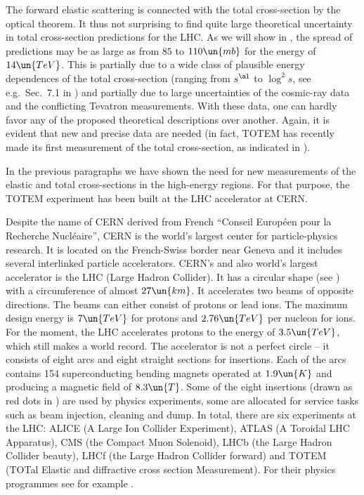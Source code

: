 The forward elastic scattering is connected with the total cross-section by the optical theorem. It thus not surprising to find quite large theoretical uncertainty in total cross-section predictions for the LHC. As we will show in , the spread of predictions may be as large as from $85$ to $110\un{mb}$ for the energy of $14\un{TeV}$. This is partially due to a wide class of plausible energy dependences of the total cross-section (ranging from $s^{\al}$ to $\log^2 s$, see e.g.~Sec.~7.1 in ) and partially due to large uncertainties of the cosmic-ray data and the conflicting Tevatron measurements. With these data, one can hardly favor any of the proposed theoretical descriptions over another. Again, it is evident that new and precise data are needed (in fact, TOTEM has recently made its first measurement of the total cross-section, as indicated in ).

In the previous paragraphs we have shown the need for new measurements of the elastic and total cross-sections in the high-energy regions. For that purpose, the TOTEM experiment has been built at the LHC accelerator at CERN.

Despite the name of CERN derived from French ``Conseil Europ\' een pour la Recherche Nucl\' eaire'', CERN  is the world's largest center for particle-physics research. It is located on the French-Swiss border near Geneva and it includes several interlinked particle accelerators. CERN's and also world's largest accelerator is the LHC  (Large Hadron Collider). It has a circular shape (see ) with a circumference of almost $27\un{km}$. It accelerates two beams of opposite directions. The beams can either consist of protons or lead ions. The maximum design energy is $7\un{TeV}$ for protons and $2.76\un{TeV}$ per nucleon for ions. For the moment, the LHC accelerates protons to the energy of $3.5\un{TeV}$, which still makes a world record. The accelerator is not a perfect circle -- it consists of eight arcs and eight straight sections for insertions. Each of the arcs contains 154 superconducting bending magnets operated at $1.9\un{K}$ and producing a magnetic field of $8.3\un{T}$. Some of the eight insertions (drawn as red dots in ) are used by physics experiments, some are allocated for service tasks such as beam injection, cleaning and dump. In total, there are six experiments at the LHC: ALICE (A Large Ion Collider Experiment), ATLAS (A Toroidal LHC Apparatus), CMS (the Compact Muon Solenoid), LHCb (the Large Hadron Collider beauty), LHCf (the Large Hadron Collider forward) and TOTEM (TOTal Elastic and diffractive cross section Measurement). For their physics programmes see for example .

